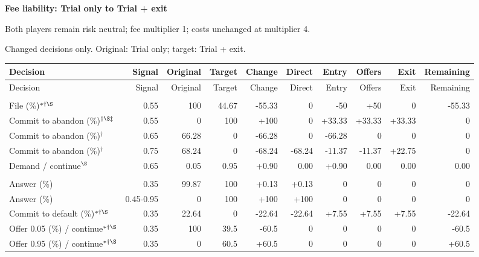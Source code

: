 \documentclass[10pt]{article}
\begin{document}
{\large\bfseries Fee liability: Trial only to Trial + exit}\par
Both players remain risk neutral; fee multiplier 1; costs unchanged at multiplier 4.\par
{\small Changed decisions only. Original: Trial only; target: Trial + exit.}\par
{\small\setlength{\tabcolsep}{3pt}\begin{longtable}{@{}>{\raggedright\arraybackslash}p{1.65in}rrrrrrrrr@{}}
\toprule Decision & Signal & Original & Target & Change & Direct & Entry & Offers & Exit & Remaining \\\midrule\endfirsthead
\toprule Decision & Signal & Original & Target & Change & Direct & Entry & Offers & Exit & Remaining \\\midrule\endhead
\bottomrule\endfoot
\multicolumn{10}{@{}l}{\textbf{Plaintiff}}\\
File (\%)$^{*\dagger\S}$ & 0.55 & 100 & 44.67 & -55.33 & 0 & -50 & +50 & 0 & -55.33\\
Commit to abandon (\%)$^{\dagger\S\ddagger}$ & 0.55 & 0 & 100 & +100 & 0 & +33.33 & +33.33 & +33.33 & 0\\
Commit to abandon (\%)$^{\dagger}$ & 0.65 & 66.28 & 0 & -66.28 & 0 & -66.28 & 0 & 0 & 0\\
Commit to abandon (\%)$^{\dagger}$ & 0.75 & 68.24 & 0 & -68.24 & -68.24 & -11.37 & -11.37 & +22.75 & 0\\
Demand / continue$^{\S}$ & 0.65 & 0.05 & 0.95 & +0.90 & 0.00 & +0.90 & 0.00 & 0.00 & 0.00\\
\multicolumn{10}{@{}l}{\textbf{Defendant}}\\
Answer (\%) & 0.35 & 99.87 & 100 & +0.13 & +0.13 & 0 & 0 & 0 & 0\\
Answer (\%) & 0.45-0.95 & 0 & 100 & +100 & +100 & 0 & 0 & 0 & 0\\
Commit to default (\%)$^{*\dagger\S}$ & 0.35 & 22.64 & 0 & -22.64 & -22.64 & +7.55 & +7.55 & +7.55 & -22.64\\
Offer 0.05 (\%) / continue$^{*\dagger\S}$ & 0.35 & 100 & 39.5 & -60.5 & 0 & 0 & 0 & 0 & -60.5\\
Offer 0.95 (\%) / continue$^{*\dagger\S}$ & 0.35 & 0 & 60.5 & +60.5 & 0 & 0 & 0 & 0 & +60.5\\
\end{longtable}}
\end{document}

